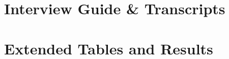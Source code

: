 
\section*{Interview Guide \& Transcripts}
\label{app:interviews}

\section*{Extended Tables and Results}
\label{app:tables}


